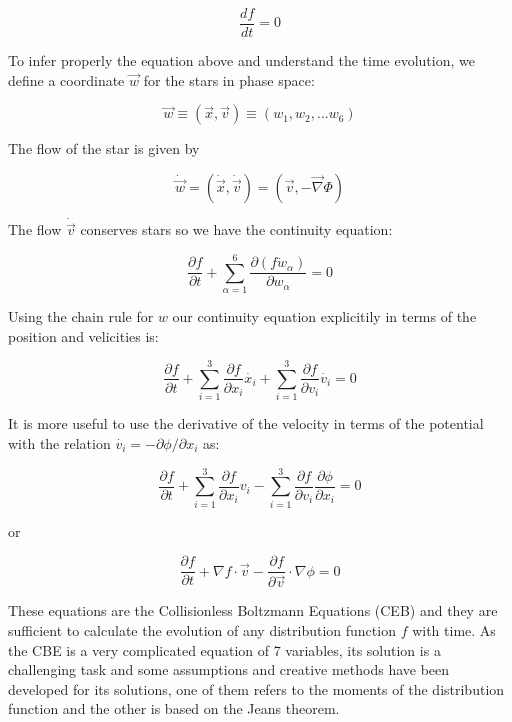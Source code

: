 \begin{equation}
\frac{df}{dt}=0
\end{equation}

To infer properly the equation above and understand the time evolution, we define a coordinate $\vec{w}$ for the stars in phase space:

\begin{equation}
\vec{w}\equiv (\vec{x},\vec{v})\equiv (w_{1},w_{2},...w_{6})
\end{equation}

The flow of the star is given by 

\begin{equation}
\dot{\vec{w}}= (\dot{\vec{x}},\dot{\vec{v}})=(\vec{v},-\vec{\nabla} \Phi)
\end{equation}

The flow $\dot{\vec{v}}$ conserves stars so we have the continuity equation:

\begin{equation}
\frac{\partial f}{\partial t}+\sum_{\alpha=1}^{6}\frac{\partial (f\dot{w}_{\alpha})}{\partial w_{\alpha}}=0
\end{equation}

Using the chain rule for $w$ our continuity equation explicitily in terms of the position and velicities is:

\begin{equation}
\frac{\partial f}{\partial t}+\sum_{i=1}^{3}\frac{\partial f}{\partial x_{i}}\dot{x_{i}}+\sum_{i=1}^{3}\frac{\partial f}{\partial v_{i}}\dot{v_{i}}=0
\end{equation}

It is more useful to use the derivative of the velocity in terms of the potential with the relation $\dot{v_{i}}=-\partial\phi / \partial x_{i}$ as:

\begin{equation}
\frac{\partial f}{\partial t}+\sum_{i=1}^{3}\frac{\partial f}{\partial x_{i}}v_{i}-\sum_{i=1}^{3}\frac{\partial f}{\partial v_{i}}\frac{\partial\phi}{\partial x_{i}}=0
\end{equation}

or

\begin{equation}
\frac{\partial f}{\partial t}+\nabla f\cdot\vec{v}-\frac{\partial f}{\partial\overrightarrow{v}}\cdot\nabla\phi=0
\end{equation}

These equations are the Collisionless Boltzmann Equations (CEB) and they are sufficient to calculate the evolution of any distribution function $f$ with time. As the CBE is a very complicated equation of 7 variables, its solution is a challenging task and some assumptions and creative methods have been developed for its solutions, one of them refers to the moments of the distribution function and the other is based on the Jeans theorem.

